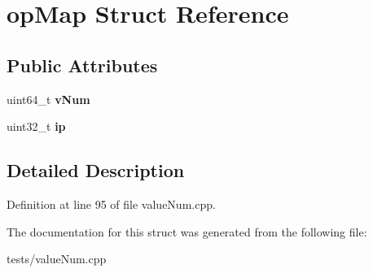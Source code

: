 \hypertarget{structopMap}{\section{op\-Map Struct Reference}
\label{structopMap}
}
\subsection*{Public Attributes}
\begin{DoxyCompactItemize}
\item 
\hypertarget{structopMap_a87c216a6e382cebf80de8b729a9c3caa}{uint64\-\_\-t {\bfseries v\-Num}}\label{structopMap_a87c216a6e382cebf80de8b729a9c3caa}

\item 
\hypertarget{structopMap_a18f1a36ec0253112e98f505a1bd681d6}{uint32\-\_\-t {\bfseries ip}}\label{structopMap_a18f1a36ec0253112e98f505a1bd681d6}

\end{DoxyCompactItemize}


\subsection{Detailed Description}


Definition at line 95 of file value\-Num.\-cpp.



The documentation for this struct was generated from the following file\-:\begin{DoxyCompactItemize}
\item 
tests/value\-Num.\-cpp\end{DoxyCompactItemize}
